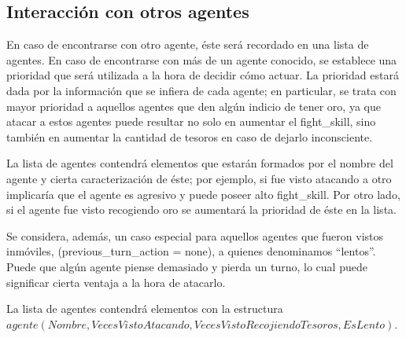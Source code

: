 \documentclass[a4paper,10pt,spanish]{article}
\begin{document}
	\subsection{Interacci\'on con otros agentes}
	
	En caso de encontrarse con otro agente, \'este ser\'a recordado en una lista de agentes. En caso de encontrarse con m\'as de un agente conocido, se establece una prioridad que ser\'a utilizada a la hora de decidir c\'omo actuar. La prioridad estar\'a dada por la informaci\'on que se infiera de cada agente; en particular, se trata con mayor prioridad a aquellos agentes que den alg\'un indicio de tener oro, ya que atacar a estos agentes puede resultar no solo en aumentar el fight\_skill, sino tambi\'en en aumentar la cantidad de tesoros en caso de dejarlo inconsciente.
	
	La lista de agentes contendr\'a elementos que estar\'an formados por el nombre del agente y cierta caracterizaci\'on de \'este; por ejemplo, si fue visto atacando a otro implicar\'ia que el agente es agresivo y puede poseer alto fight\_skill. Por otro lado, si el agente fue visto recogiendo oro se aumentar\'a la prioridad de \'este en la lista. 
	
	Se considera, adem\'as, un caso especial para aquellos agentes que fueron vistos inm\'oviles, (previous\_turn\_action = none), a quienes denominamos ``lentos''. Puede que alg\'un agente piense demasiado y pierda un turno, lo cual puede significar cierta ventaja a la hora de atacarlo.
	
	La lista de agentes contendr\'a elementos con la estructura \\
	$agente(Nombre, VecesVistoAtacando, VecesVistoRecojiendoTesoros, EsLento)$.
	
% 	
	
\end{document}
